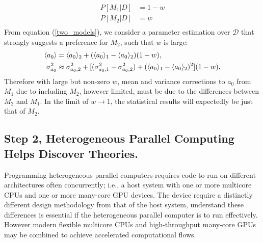 \documentclass[10pt]{article}[draft]
\begin{document}
\begin{equation}
	\begin{split}
	P[M_1|D]  & = 1 - w \\
	P[M_2|D]  & =  w \\
	\end{split}
\label{two_models}
\end{equation}
From equation (\ref{two_models}), we consider a parameter estimation over $\mathcal{D}$ that strongly suggests a preference for $M_2$, such that $w$ is large:
\begin{equation}
	\begin{split}
		\inn{a_0} & = \inn{a_0}_2 + ( \inn{a_0}_1 - \inn{a_0}_2) (1- w), \\
		\sigma^2_{a_0} & \approx \sigma^2_{a_0,2} +[ (\sigma^2_{a_0,1} - \sigma^2_{a_0,2})   + ( \inn{a_0}_1 - \inn{a_0}_2)^2 ](1- w),
	\end{split}
\end{equation}
Therefore with large but non-zero $w$, mean and variance corrections to $a_0$ from $M_1$ due to including $M_2$, however limited, must be due to the differences between $M_2$ and $M_1$. In the limit of $w \rightarrow 1$, the statistical results will expectedly be just that of $M_2$. 
\vspace{0.25in}


\subsection*{Step 2, Heterogeneous Parallel Computing Helps Discover Theories.}
	
Programming heterogeneous parallel computers requires code to run on  different architectures often concurrently; i.e., a host system with one or more multicore CPUs and one or more many-core GPU devices. The device require a distinctly different design methodology from that of the host system,  understand these differences is essential if the heterogeneous parallel computer is to run effectively. However modern flexible multicore CPUs and high-throughput many-core GPUs may be combined  to achieve accelerated computational flows. 
\end{document}
